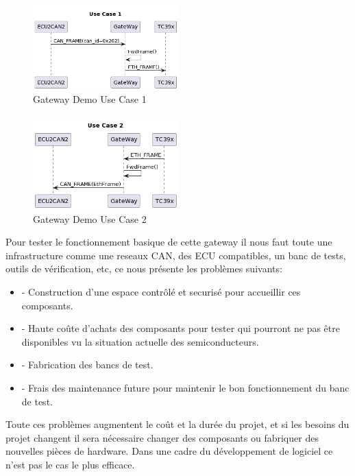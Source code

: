 \begin{figure}[!htb]
 \centering
 \includegraphics[width=0.5\textwidth]{img/GWUseCase1.png}
 \caption{Gateway Demo Use Case 1}
 \label{fig:gw-demo-uc1}
\end{figure}

\begin{figure}[!htb]
 \centering
 \includegraphics[width=0.5\textwidth]{img/GWUseCase2.png}
 \caption{Gateway Demo Use Case 2}
 \label{fig:gw-demo-uc2}
\end{figure}

Pour tester le fonctionnement basique de cette gateway il nous faut toute une infrastructure comme une reseaux CAN, des ECU compatibles, un banc de tests, outils de vérification, etc, ce nous présente les probl\`emes suivants:
\begin{itemize}
    \item - Construction d'une espace contr\^ol\'e et securis\'e pour accueillir ces composants.
    \item - Haute coûte d'achats des composants pour tester qui pourront ne pas être disponibles vu la situation actuelle des semiconducteurs.
    \item - Fabrication des bancs de test.
    \item - Frais des maintenance future pour maintenir le bon fonctionnement du banc de test.  
\end{itemize}

Toute ces probl\`emes augmentent le co\^ut et la dur\'ee du projet, et si les besoins du projet changent il sera nécessaire changer des composants ou fabriquer des nouvelles pièces de hardware. Dans une cadre du développement de logiciel ce n'est pas le cas le plus efficace.

